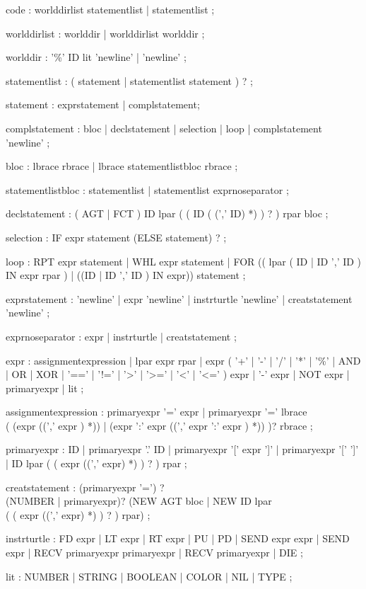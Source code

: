\begin{rail}
code : worlddirlist statementlist | statementlist ;

worlddirlist : worlddir
| worlddirlist worlddir
;

worlddir : '\%' ID lit 'newline'
| 'newline'
;

statementlist : ( statement | statementlist statement ) ?
;

statement : exprstatement | complstatement;

complstatement : bloc
| declstatement
| selection
| loop
| complstatement 'newline'
;

bloc : lbrace rbrace
| lbrace statementlistbloc rbrace
;

statementlistbloc : statementlist
| statementlist exprnoseparator
;

declstatement : ( AGT | FCT ) ID lpar ( ( ID ( (',' ID) *) ) ? ) rpar bloc
;

selection : IF expr statement (ELSE statement) ? ;

loop : RPT expr statement
| WHL expr statement
| FOR (( lpar ( ID | ID ',' ID ) IN expr rpar ) | ((ID | ID ',' ID ) IN expr)) statement
;

exprstatement : 'newline'
| expr 'newline'
| instrturtle 'newline'
| creatstatement 'newline'
;

exprnoseparator : expr
| instrturtle
| creatstatement
;

expr : assignmentexpression
| lpar expr rpar
| expr ( '+'
| '-'
| '/'
| '*'
| '\%'
| AND
| OR
| XOR
| '=='
| '!='
| '>'
| '>='
| '<'
| '<=' ) expr
| '-' expr
| NOT expr
| primaryexpr
| lit
;

assignmentexpression : primaryexpr '=' expr
| primaryexpr '=' lbrace \\ (
(expr ((',' expr ) *))
| (expr ':' expr ((',' expr ':' expr ) *))
)? rbrace
;

primaryexpr : ID
| primaryexpr '.' ID
| primaryexpr '[' expr ']'
| primaryexpr '[' ']'
| ID lpar ( ( expr ((',' expr) *) ) ? )  rpar
;

creatstatement : (primaryexpr '=') ? \\ (NUMBER | primaryexpr)? (NEW AGT bloc
| NEW ID lpar \\ ( ( expr ((',' expr) *) ) ? ) rpar)
;

instrturtle : FD expr
| LT expr
| RT expr
| PU
| PD
| SEND expr expr
| SEND expr
| RECV primaryexpr primaryexpr
| RECV primaryexpr
| DIE ;

lit : NUMBER
| STRING
| BOOLEAN
| COLOR
| NIL
| TYPE ;
\end{rail}


